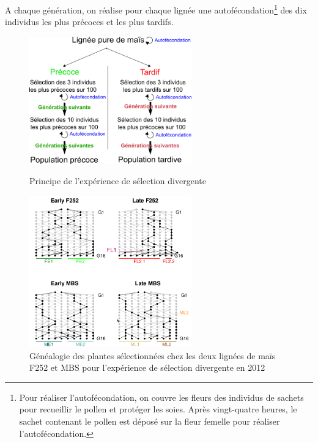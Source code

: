 \documentclass[12pt,a4paper]{article}
\begin{document}
			 			A chaque génération, on réalise pour chaque lignée une autofécondation\footnote{Pour réaliser l'autofécondation, on couvre les fleurs des individus de sachets pour recueillir le pollen et protéger les soies. Après vingt-quatre heures, le sachet contenant le pollen est déposé sur la fleur femelle pour réaliser l'autofécondation.} des dix individus les plus précoces et les plus tardifs.
			 			
			 			\begin{figure}[h]
			 				
			 				\begin{minipage}[t]{0.45\textwidth}
			 					\centering
			 					\includegraphics[width=7cm]{selec_div.png} %
			 					\caption{Principe de l'expérience de sélection divergente}
			 					\label{selec.div}
			 				\end{minipage}
			 				\quad
			 				\begin{minipage}[t]{0.45\textwidth}
			 					\centering
			 					\includegraphics[width=7cm]{carte_gen.png} %
			 					\caption{Généalogie des plantes sélectionnées chez les deux lignées de maïs F252 et MBS pour l'expérience de sélection divergente en 2012}
			 					\label{carte_gen}
			 					
			 				\end{minipage}
			 					
			 
			 
			 				
			 			\end{figure}
			 			
\end{document}
